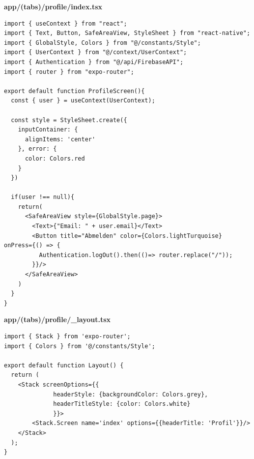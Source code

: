 \documentclass[11pt, twoside]{article}
\begin{document}
\textbf{app/(tabs)/profile/index.tsx}
\begin{lstlisting}
import { useContext } from "react";
import { Text, Button, SafeAreaView, StyleSheet } from "react-native";
import { GlobalStyle, Colors } from "@/constants/Style";
import { UserContext } from "@/context/UserContext";
import { Authentication } from "@/api/FirebaseAPI";
import { router } from "expo-router";

export default function ProfileScreen(){
  const { user } = useContext(UserContext);

  const style = StyleSheet.create({
    inputContainer: {
      alignItems: 'center'
    }, error: {
      color: Colors.red
    }
  })

  if(user !== null){
    return(
      <SafeAreaView style={GlobalStyle.page}>
        <Text>{"Email: " + user.email}</Text>
        <Button title="Abmelden" color={Colors.lightTurquoise} onPress={() => {
          Authentication.logOut().then(()=> router.replace("/"));
        }}/>
      </SafeAreaView>
    )
  }
}
\end{lstlisting}

\textbf{app/(tabs)/profile/\_layout.tsx}
\begin{lstlisting}
import { Stack } from 'expo-router';
import { Colors } from '@/constants/Style';

export default function Layout() {
  return (
    <Stack screenOptions={{
              headerStyle: {backgroundColor: Colors.grey},
              headerTitleStyle: {color: Colors.white}
              }}>
        <Stack.Screen name='index' options={{headerTitle: 'Profil'}}/>
    </Stack>
  );
}
\end{lstlisting}
\end{document}
